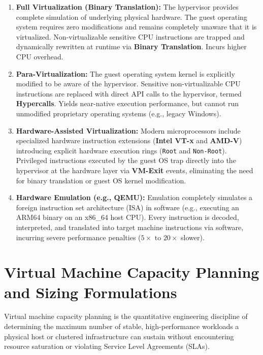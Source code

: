 \begin{enumerate}[label=\bfseries\arabic*.]
    \item \textbf{Full Virtualization (Binary Translation):} The hypervisor provides complete simulation of underlying physical hardware. The guest operating system requires zero modifications and remains completely unaware that it is virtualized. Non-virtualizable sensitive CPU instructions are trapped and dynamically rewritten at runtime via \textbf{Binary Translation}. Incurs higher CPU overhead.
    \item \textbf{Para-Virtualization:} The guest operating system kernel is explicitly modified to be aware of the hypervisor. Sensitive non-virtualizable CPU instructions are replaced with direct API calls to the hypervisor, termed \textbf{Hypercalls}. Yields near-native execution performance, but cannot run unmodified proprietary operating systems (e.g., legacy Windows).
    \item \textbf{Hardware-Assisted Virtualization:} Modern microprocessors include specialized hardware instruction extensions (\textbf{Intel VT-x} and \textbf{AMD-V}) introducing explicit hardware execution rings (\texttt{Root} and \texttt{Non-Root}). Privileged instructions executed by the guest OS trap directly into the hypervisor at the hardware layer via \textbf{VM-Exit} events, eliminating the need for binary translation or guest OS kernel modification.
    \item \textbf{Hardware Emulation (e.g., QEMU):} Emulation completely simulates a foreign instruction set architecture (ISA) in software (e.g., executing an ARM64 binary on an x86\_64 host CPU). Every instruction is decoded, interpreted, and translated into target machine instructions via software, incurring severe performance penalties ($5\times\text{ to }20\times$ slower).
\end{enumerate}


\section{Virtual Machine Capacity Planning and Sizing Formulations}
\label{sec:vm_capacity_planning}

Virtual machine capacity planning is the quantitative engineering discipline of determining the maximum number of stable, high-performance workloads a physical host or clustered infrastructure can sustain without encountering resource saturation or violating Service Level Agreements (SLAs).

